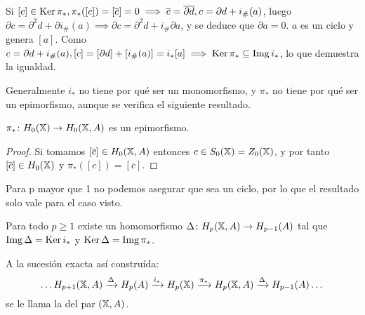 Si $[c] \in \operatorname{Ker} \pi_*, \pi_*([c]) = [\overline{c}] = 0 \implies \overline{c} = \overline{\partial d}, c = \partial d + i_\#(a)$,
luego $\partial c = \partial^2 d + \partial i_\#(a) \implies \partial c = \partial^2 d + i_\# \partial a$, y se deduce que $\partial a = 0$.
$a$ es un ciclo y genera $[a]$. Como $c = \partial d + i_\#(a), [c] = [\partial d] + [i_\#(a)] = i_*[a] \implies \operatorname{Ker} \pi_* \subseteq \operatorname{Img} i_*$,
lo que demuestra la igualdad.

Generalmente $i_*$ no tiene por qué ser un monomorfismo, y $\pi_*$ no tiene por qué ser un epimorfismo, aunque se verifica el siguiente resultado.

\begin{proposition}
  $\pi_* \colon H_0({\mathbb X}) \to H_0({\mathbb X}, A)$ es un epimorfismo.
\end{proposition}

\begin{proof}
  Si tomamos $[\overline{c}] \in H_0({\mathbb X}, A)$ entonces $c \in S_0({\mathbb X}) = Z_0({\mathbb X})$, y por tanto $[\overline{c}] \in H_0({\mathbb X})$ y
  $\pi_*([c]) = [\overline{c}]$.
\end{proof}

\begin{remark}
  Para p mayor que 1 no podemos asegurar que sea un ciclo, por lo que el resultado solo vale para el caso visto.
\end{remark}

\begin{proposition}
  Para todo $p \geq 1$ existe un homomorfismo $\Delta \colon H_p({\mathbb X}, A) \to H_{p-1}(A)$ tal que $\operatorname{Img} \Delta = \operatorname{Ker} i_*$ y $\operatorname{Ker} \Delta = \operatorname{Img} \pi_*$.

  A la sucesión exacta así construída:
  \[\dots H_{p+1}({\mathbb X}, A) \xrightarrow{\Delta} H_p(A) \xrightarrow{i_*} H_p({\mathbb X}) \xrightarrow{\pi_*} H_p({\mathbb X}, A) \xrightarrow{\Delta} H_{p-1}(A) \dots\]
  se le llama la \textbf{\underline{}} del par $({\mathbb X}, A)$.
\end{proposition}

